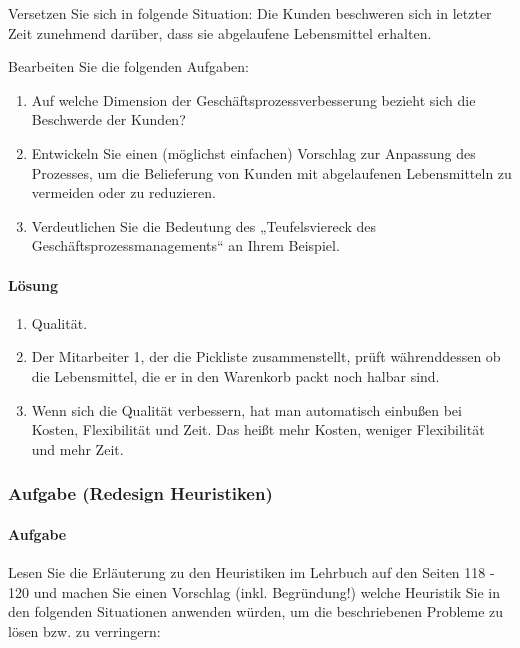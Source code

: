     Versetzen Sie sich in folgende Situation: Die Kunden beschweren sich in letzter Zeit zunehmend darüber, dass sie abgelaufene Lebensmittel erhalten.

    Bearbeiten Sie die folgenden Aufgaben:
    \begin{enumerate}[label=\alph*)]
        \item Auf welche Dimension der Geschäftsprozessverbesserung bezieht sich die Beschwerde der Kunden?
        \item Entwickeln Sie einen (möglichst einfachen) Vorschlag zur Anpassung des Prozesses, um die Belieferung von Kunden mit abgelaufenen Lebensmitteln zu vermeiden oder zu reduzieren.
        \item Verdeutlichen Sie die Bedeutung des „Teufelsviereck des Geschäftsprozessmanagements“ an Ihrem Beispiel.
    \end{enumerate}
\paragraph*{Lösung}
    \begin{enumerate}[label=\alph*)]
        \item Qualität.
        \item Der Mitarbeiter 1, der die Pickliste zusammenstellt, prüft währenddessen ob die Lebensmittel, die er in den Warenkorb packt noch halbar sind.
        \item Wenn sich die Qualität verbessern, hat man automatisch einbußen bei Kosten, Flexibilität und Zeit. Das heißt mehr Kosten, weniger Flexibilität und mehr Zeit.
    \end{enumerate}


\subsubsection*{Aufgabe (Redesign Heuristiken)}
\paragraph*{Aufgabe}
    Lesen Sie die Erläuterung zu den Heuristiken im Lehrbuch auf den Seiten 118 - 120 und machen Sie einen Vorschlag (inkl. Begründung!) welche Heuristik Sie in den folgenden Situationen anwenden würden, um die beschriebenen Probleme zu lösen bzw. zu verringern:
    
